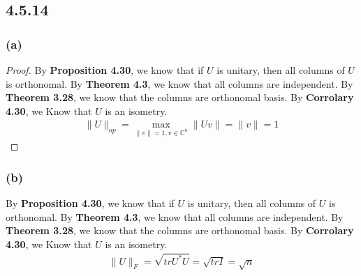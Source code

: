 \documentclass{article}
\newtheorem*{proof}{Proof}
\begin{document}
\subsection*{4.5.14}
\subsubsection*{(a)}
\begin{proof}
    By \textbf{Proposition 4.30}, we know that if $U$ is unitary, then all columns of $U$ is orthonomal. By \textbf{Theorem 4.3}, we know that all columns are independent. 
    By \textbf{Theorem 3.28}, we know that the columns are orthonomal basis. By \textbf{Corrolary 4.30}, we Know that $U$ is an isometry.
    \begin{equation*}
        \begin{split}
            \|U\|_{op} = \mathop{max} \limits _ {\|v\| = 1, v \in \mathbb{C}^n} \|Uv\| = \|v\| = 1
        \end{split}
    \end{equation*}
\end{proof}

\subsubsection*{(b)}
By \textbf{Proposition 4.30}, we know that if $U$ is unitary, then all columns of $U$ is orthonomal. By \textbf{Theorem 4.3}, we know that all columns are independent. 
By \textbf{Theorem 3.28}, we know that the columns are orthonomal basis. By \textbf{Corrolary 4.30}, we Know that $U$ is an isometry.
\begin{equation*}
    \begin{split}
        \|U\|_F = \sqrt{trU^*U }= \sqrt{trI} = \sqrt{n}
    \end{split}
\end{equation*}
\end{document}
